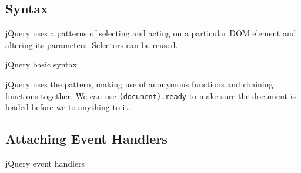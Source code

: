\subsection{Syntax}\label{sub:syntax}

jQuery uses a patterns of selecting and acting on a particular DOM element and altering its parameters.
Selectors can be reused.
\begin{highlight}{jQuery basic syntax}
\end{highlight}
jQuery uses the pattern, making use of anonymous functions and chaining functions together.
We can use \texttt{(document).ready} to make sure the document is loaded before we to anything to it.


\subsection{Attaching Event Handlers}\label{sub:attaching_event_handlers}

\begin{highlight}{jQuery event handlers}
\end{highlight}
